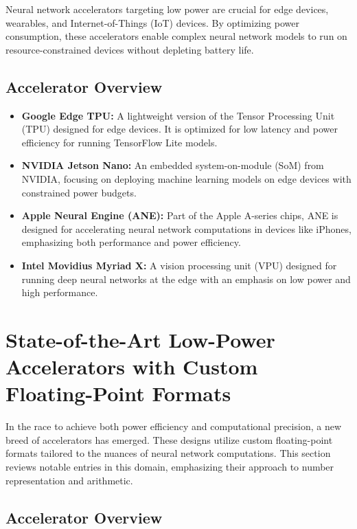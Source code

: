 Neural network accelerators targeting low power are crucial for edge devices, wearables, and Internet-of-Things (IoT) devices. By optimizing power consumption, these accelerators enable complex neural network models to run on resource-constrained devices without depleting battery life.

\subsection{Accelerator Overview}

\begin{itemize}
	\item \textbf{Google Edge TPU:} A lightweight version of the Tensor Processing Unit (TPU) designed for edge devices. It is optimized for low latency and power efficiency for running TensorFlow Lite models.
	
	\item \textbf{NVIDIA Jetson Nano:} An embedded system-on-module (SoM) from NVIDIA, focusing on deploying machine learning models on edge devices with constrained power budgets.
	
	\item \textbf{Apple Neural Engine (ANE):} Part of the Apple A-series chips, ANE is designed for accelerating neural network computations in devices like iPhones, emphasizing both performance and power efficiency.
	
	\item \textbf{Intel Movidius Myriad X:} A vision processing unit (VPU) designed for running deep neural networks at the edge with an emphasis on low power and high performance.
\end{itemize}


\section{State-of-the-Art Low-Power Accelerators with Custom Floating-Point Formats}

In the race to achieve both power efficiency and computational precision, a new breed of accelerators has emerged. These designs utilize custom floating-point formats tailored to the nuances of neural network computations. This section reviews notable entries in this domain, emphasizing their approach to number representation and arithmetic.

\subsection{Accelerator Overview}

